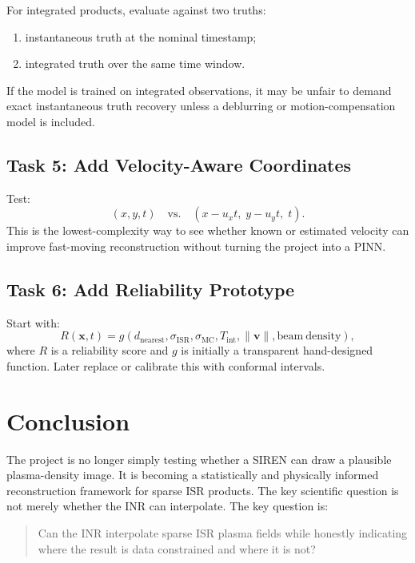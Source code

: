 \documentclass[11pt]{article}
\begin{document}
For integrated products, evaluate against two truths:
\begin{enumerate}[leftmargin=*]
  \item instantaneous truth at the nominal timestamp;
  \item integrated truth over the same time window.
\end{enumerate}
If the model is trained on integrated observations, it may be unfair to demand exact instantaneous
truth recovery unless a deblurring or motion-compensation model is included.

\subsection{Task 5: Add Velocity-Aware Coordinates}

Test:
\begin{equation}
  (x,y,t)
  \quad \mathrm{vs.}\quad
  (x-u_x t,\;y-u_y t,\;t).
\end{equation}
This is the lowest-complexity way to see whether known or estimated velocity can improve
fast-moving reconstruction without turning the project into a PINN.

\subsection{Task 6: Add Reliability Prototype}

Start with:
\begin{equation}
  R(\mathbf{x},t)
  =
  g\left(
    d_{\mathrm{nearest}},
    \sigma_{\mathrm{ISR}},
    \sigma_{\mathrm{MC}},
    T_{\mathrm{int}},
    \|\mathbf{v}\|,
    \mathrm{beam\ density}
  \right),
\end{equation}
where $R$ is a reliability score and $g$ is initially a transparent hand-designed function. Later
replace or calibrate this with conformal intervals.

\section{Conclusion}

The project is no longer simply testing whether a SIREN can draw a plausible plasma-density
image. It is becoming a statistically and physically informed reconstruction framework for sparse
ISR products. The key scientific question is not merely whether the INR can interpolate. The key
question is:
\begin{quote}
Can the INR interpolate sparse ISR plasma fields while honestly indicating where the result is
data constrained and where it is not?
\end{quote}
\end{document}
